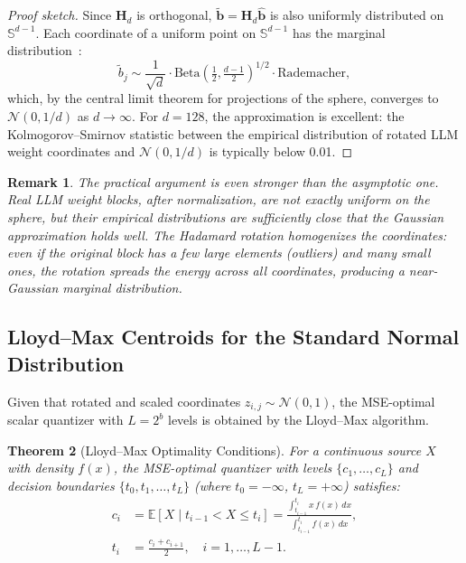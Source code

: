 \documentclass[10pt,twocolumn]{article}
\newtheorem{theorem}{Theorem}[section]
\newtheorem{remark}[theorem]{Remark}
\newcommand{\E}{\mathbb{E}}
\newcommand{\bH}{\mathbf{H}}
\newcommand{\bb}{\mathbf{b}}
\begin{document}
\begin{proof}[Proof sketch]
Since $\bH_d$ is orthogonal, $\tilde{\bb} = \bH_d \hat{\bb}$ is also uniformly distributed on $\mathbb{S}^{d-1}$. Each coordinate of a uniform point on $\mathbb{S}^{d-1}$ has the marginal distribution~\cite{gray1998quantization}:
\begin{equation}
  \tilde{b}_j \sim \frac{1}{\sqrt{d}} \cdot \text{Beta}\!\left(\tfrac{1}{2}, \tfrac{d-1}{2}\right)^{1/2} \cdot \text{Rademacher},
\end{equation}
which, by the central limit theorem for projections of the sphere, converges to $\mathcal{N}(0, 1/d)$ as $d \to \infty$. For $d = 128$, the approximation is excellent: the Kolmogorov--Smirnov statistic between the empirical distribution of rotated LLM weight coordinates and $\mathcal{N}(0, 1/d)$ is typically below 0.01.
\end{proof}

\begin{remark}
The practical argument is even stronger than the asymptotic one. Real LLM weight blocks, after normalization, are not exactly uniform on the sphere, but their empirical distributions are sufficiently close that the Gaussian approximation holds well. The Hadamard rotation \emph{homogenizes} the coordinates: even if the original block has a few large elements (outliers) and many small ones, the rotation spreads the energy across all coordinates, producing a near-Gaussian marginal distribution.
\end{remark}

\subsection{Lloyd--Max Centroids for the Standard Normal Distribution}
\label{sec:lloydmax}

Given that rotated and scaled coordinates $z_{i,j} \sim \mathcal{N}(0,1)$, the MSE-optimal scalar quantizer with $L = 2^b$ levels is obtained by the Lloyd--Max algorithm.

\begin{theorem}[Lloyd--Max Optimality Conditions]
\label{thm:lloydmax}
For a continuous source $X$ with density $f(x)$, the MSE-optimal quantizer with levels $\{c_1, \ldots, c_L\}$ and decision boundaries $\{t_0, t_1, \ldots, t_L\}$ (where $t_0 = -\infty$, $t_L = +\infty$) satisfies:
\begin{align}
  c_i &= \E[X \mid t_{i-1} < X \leq t_i] = \frac{\int_{t_{i-1}}^{t_i} x \, f(x) \, dx}{\int_{t_{i-1}}^{t_i} f(x) \, dx}, \label{eq:centroid} \\
  t_i &= \frac{c_i + c_{i+1}}{2}, \quad i = 1, \ldots, L-1. \label{eq:boundary}
\end{align}
\end{theorem}
\end{document}
